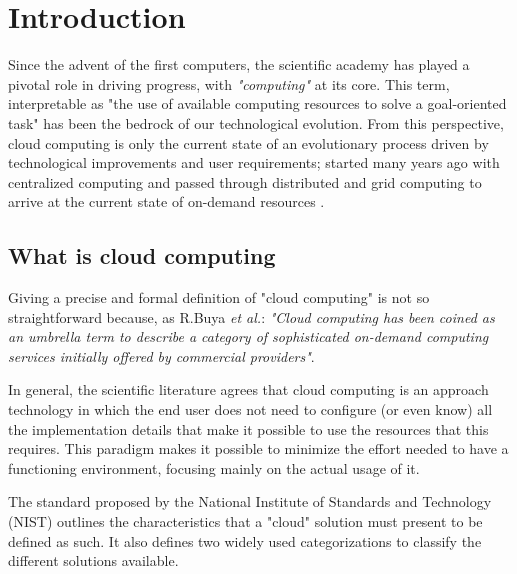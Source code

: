 \chapter{Introduction}


Since the advent of the first computers, the scientific academy has played a
pivotal role in driving progress, with \textit{"computing"} at its core. This
term, interpretable as "the use of available computing resources to solve a
goal-oriented task" has been the bedrock of our technological evolution.
From this perspective, cloud computing is only the current state of an
evolutionary process driven by technological improvements and user requirements;
started many years ago with centralized computing and passed through distributed
and grid computing to arrive at the current state of on-demand resources
\cite{Surbiryala2019CloudCH}.

\section{What is cloud computing}

Giving a precise and formal definition of "cloud computing" is not so
straightforward because, as R.Buya \emph{et al.}\cite{RBuyya2011}:
\textit{"Cloud computing has been coined as an umbrella term to describe a category of
sophisticated on-demand computing services initially offered by commercial providers"}.

In general, the scientific literature agrees that cloud computing is an approach
technology in which the end user does not need to configure (or even know) all
the implementation details that make it possible to use the resources that this
requires. This paradigm makes it possible to minimize the effort needed to have
a functioning environment, focusing mainly on the actual usage of it.

The standard proposed by the National Institute of Standards and Technology
(NIST)\cite{nistdef} outlines the characteristics that a "cloud" solution must
present to be defined as such. It also defines two widely used categorizations
to classify the different solutions available.



